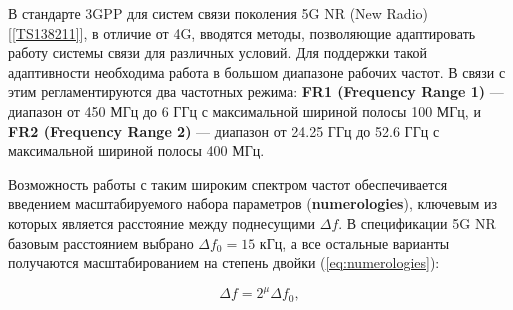 %
%
%
  
В стандарте 3GPP для систем связи поколения 5G NR (New Radio) [\ref{TS138211}],
в отличие от 4G, вводятся методы, позволяющие адаптировать работу системы связи для различных условий.
Для поддержки такой адаптивности необходима работа в большом диапазоне рабочих частот. 
В связи с этим регламентируются два частотных режима: \textbf{FR1 (Frequency Range 1)} 
— диапазон от 450 МГц до 6 ГГц с максимальной шириной полосы 100 МГц, 
и \textbf{FR2 (Frequency Range 2)} — диапазон от 24.25 ГГц до 52.6 ГГц
с максимальной шириной полосы 400 МГц.

Возможность работы с таким широким спектром частот обеспечива\-ется введением масштабируемого набора параметров
(\textbf{numerologies}), ключевым из которых является расстояние между поднесущими $\Delta f$. 
В спецификации 5G NR базовым расстоянием выбрано $\Delta f_0 = 15$ кГц, 
а все остальные варианты получаются масштабированием на степень двойки (\ref{eq:numerologies}):

\begin{equation}
    \Delta f = 2^{\mu} \Delta f_0,
    \label{eq:numerologies}
\end{equation}

